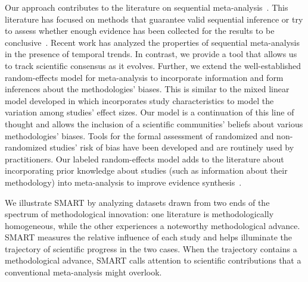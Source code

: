 Our approach contributes to the literature on sequential meta-analysis~\citep{Higgins_Whitehead_Simmonds_2011,Van_Der_Tweel_Bollen_2010,Spence_Steinsaltz_Fanshawe_2016,Bollen_Uiterwaal_Van_Vught_Van_Der_Tweel_2006,Kulinskaya_21}.  This literature has focused on methods that guarantee valid sequential inference \citep{Higgins_Whitehead_Simmonds_2011} or try to assess whether enough evidence has been collected for the results to be conclusive~\citep{Spence_Steinsaltz_Fanshawe_2016,Bollen_Uiterwaal_Van_Vught_Van_Der_Tweel_2006}. Recent work \citep{Kulinskaya_21} has analyzed the properties of sequential meta-analysis in the presence of temporal trends. 
In contrast, we provide a tool that allows us to track scientific consensus as it evolves.
Further, we extend the well-established random-effects model for meta-analysis \citep{Higgins_Thompson_Spiegelhalter_2009,Higgins_Whitehead_Simmonds_2011} to incorporate information and form inferences about the methodologies' biases.
This is similar to the mixed linear model developed in \citep{Raudenbush_1985} which incorporates study characteristics to model the variation among studies' effect sizes. Our model is a continuation of this line of thought and allows the inclusion of a scientific communities' beliefs about various methodologies' biases.
Tools for the formal assessment of randomized \citep{cochrane_ch8} and non-randomized \citep{cochrane_ch25} studies' risk of bias have been developed and are routinely used by practitioners. Our labeled random-effects model adds to the literature about incorporating prior knowledge about studies (such as information about their methodology) into meta-analysis to improve evidence synthesis~\citep{Li_94,Sutton_2001,Doi_Thalib_2008}.

We illustrate SMART by analyzing datasets drawn from two ends of the spectrum of methodological innovation: one literature is methodologically homogeneous, while the other experiences a noteworthy methodological advance.
SMART measures the relative influence of each study and helps illuminate the trajectory of scientific progress in the two cases. When the trajectory contains a methodological advance, SMART calls attention to scientific contributions that a conventional meta-analysis might overlook.